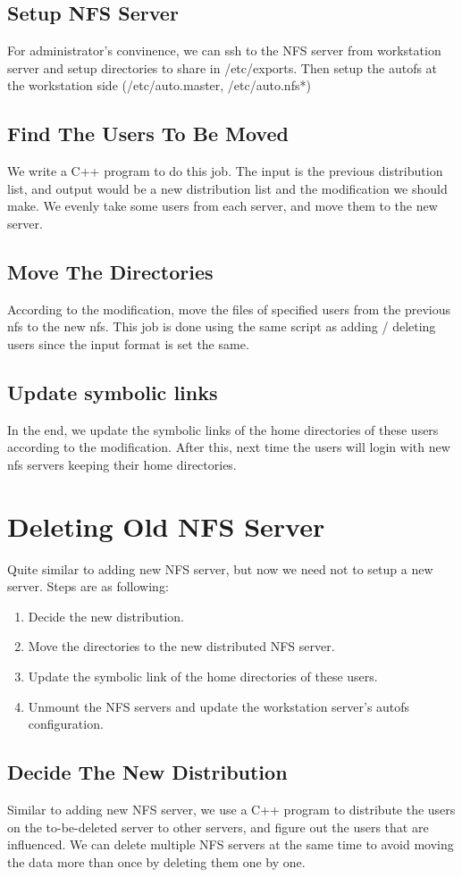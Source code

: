 \documentclass{article}
\begin{document}
\subsection{Setup NFS Server}
For administrator's convinence, we can {\cs ssh} to the NFS server from workstation server and setup directories to share in
{\cs /etc/exports}. Then setup the autofs at the workstation side ({\cs /etc/auto.master, /etc/auto.nfs*})
\subsection{Find The Users To Be Moved}
We write a C++ program to do this job. The input is the previous distribution list, and output would be a new distribution list and
the modification we should make. We evenly take some users from each server, and move them to the new server.
\subsection{Move The Directories}
According to the modification, move the files of specified users from the previous nfs to the new nfs. This job is done using the same script as adding / deleting users since the input format is set the same.
\subsection{Update symbolic links}
In the end, we update the symbolic links of the home directories of these users according to the modification. After this, next time the users will login with new nfs servers keeping their home directories.
\section{Deleting Old NFS Server}
Quite similar to adding new NFS server, but now we need not to setup a new server.
Steps are as following:
   \begin{enumerate}
   \item Decide the new distribution.
   \item Move the directories to the new distributed NFS server.
   \item Update the symbolic link of the home directories of these users.
   \item Unmount the NFS servers and update the workstation server's autofs configuration.
   \end{enumerate}
\subsection{Decide The New Distribution}
Similar to adding new NFS server, we use a C++ program to distribute the users on the to-be-deleted server to other servers, and figure out the users that are influenced. We can delete multiple NFS servers at the same time to avoid moving the data more than once by deleting them one by one.
\end{document}
